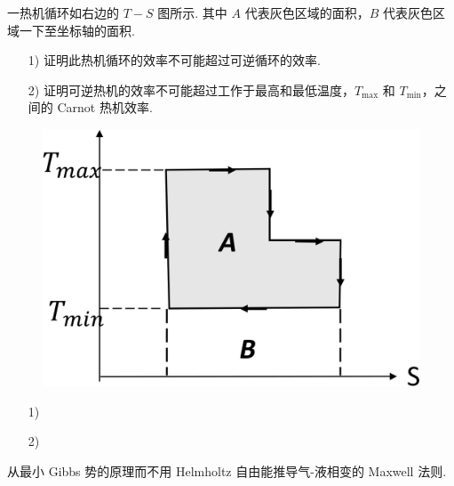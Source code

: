 \documentclass{assignment}
\begin{document}
\begin{prob}
    一热机循环如右边的 $T-S$ 图所示. 其中 $A$ 代表灰色区域的面积，$B$ 代表灰色区域一下至坐标轴的面积.
    \begin{itemize}
        \item[1)] 证明此热机循环的效率不可能超过可逆循环的效率.
        \item[2)] 证明可逆热机的效率不可能超过工作于最高和最低温度，$T_{\max}$ 和 $T_{\min}$，之间的 Carnot 热机效率.
    \end{itemize}
    \begin{figure}[h]
        \centering
        \includegraphics[width=.4\columnwidth]{A2-P3.png}
    \end{figure}
\end{prob}
\begin{pf}
    \begin{itemize}
        \item[1)] 
        \item[2)] 
    \end{itemize}
\end{pf}

\begin{prob}
    从最小 Gibbs 势的原理而不用 Helmholtz 自由能推导气-液相变的 Maxwell 法则.
\end{prob}
\begin{pf}
    
\end{pf}
\end{document}
